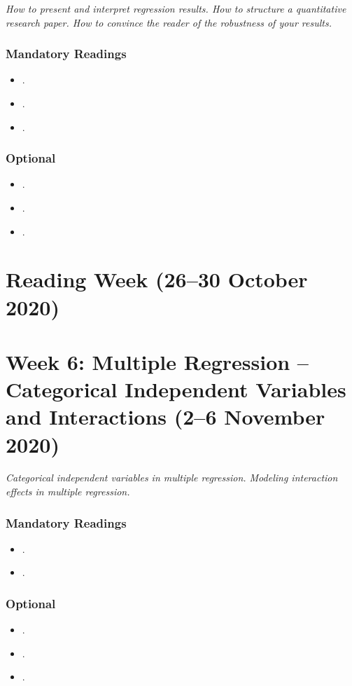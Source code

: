 \documentclass[abstract=on,parskip=full,headings=standardclasses,fontsize=11pt,paper=a4]{scrartcl}
\begin{document}
\textit{How to present and interpret regression results. How to structure a quantitative research paper. How to convince the reader of the robustness of your results.}


\subsubsection*{Mandatory Readings}
\begin{itemize}
\item {}.
\item {}.
\item {}.
\end{itemize}


\subsubsection*{Optional}
\begin{itemize}
\item {}.
\item {}.
\item {}.
\end{itemize}


\section{Reading Week (26--30 October 2020) }


\section{Week 6: Multiple Regression -- Categorical Independent Variables and Interactions (2--6 November 2020)}


\textit{Categorical independent variables in multiple regression. Modeling interaction effects in multiple regression.}

\subsubsection*{Mandatory Readings}
\begin{itemize}
\item {}.
\item {}.
\end{itemize}


\subsubsection*{Optional}
\begin{itemize}
\item {}.
\item {}.
\item {}.
\end{itemize}
\end{document}
